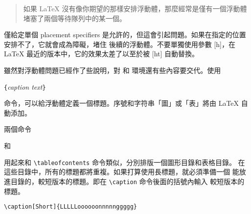\begin{quote}
如果 \LaTeX{} 沒有像你期望的那樣安排浮動體，那麼經常是僅有一個浮動體
堵塞了兩個等待隊列中的某一個。
\end{quote}

僅給定單個 placement
specifiers 是允許的，但這會引起問題。如果在指定的位置安排不了，它就會成為障礙，堵住
後續的浮動體。不要單獨使用參數 [h]，在 \LaTeX{} 最近的版本中，它的效果太差了以至於被 [ht] 
自動替換。

\bigskip
雖然對浮動體問題已經作了些說明，對  和  環境還有些內容要交代。使用

\begin{lscommand}
\verb|{|\emph{caption text}\verb|}|
\end{lscommand}

\noindent
命令，可以給浮動體定義一個標題。序號和字符串「圖」或「表」將由 \LaTeX{} 自動添加。

兩個命令

\begin{lscommand}
 和 
\end{lscommand}

\noindent
用起來和 \verb|\tableofcontents| 命令類似，分別排版一個圖形目錄和表格目錄。
在這些目錄中，所有的標題都將重複。如果打算使用長標題，就必須準備一個
能放進目錄的，較短版本的標題。即在 \verb|\caption| 命令後面的括號內輸入
較短版本的標題。
\begin{code}
\verb|\caption[Short]{LLLLLoooooonnnnnggggg}|
\end{code}

